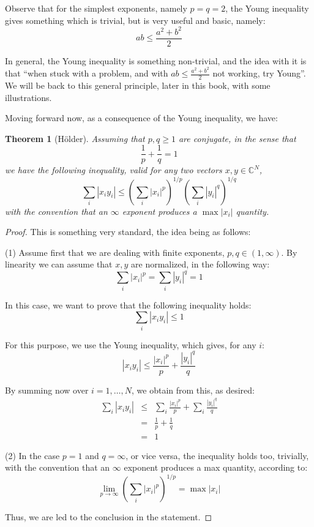 \documentclass[12pt]{amsbook}
\newtheorem{theorem}{Theorem}[chapter]
\begin{document}
Observe that for the simplest exponents, namely $p=q=2$, the Young inequality gives something which is trivial, but is very useful and basic, namely:
$$ab\leq\frac{a^2+b^2}{2}$$

In general, the Young inequality is something non-trivial, and the idea with it is that ``when stuck with a problem, and with $ab\leq\frac{a^2+b^2}{2}$ not working, try Young''. We will be back to this general principle, later in this book, with some illustrations.

\bigskip

Moving forward now, as a consequence of the Young inequality, we have:


\begin{theorem}[H\"older]
Assuming that $p,q\geq 1$ are conjugate, in the sense that 
$$\frac{1}{p}+\frac{1}{q}=1$$
we have the following inequality, valid for any two vectors $x,y\in\mathbb C^N$,
$$\sum_i|x_iy_i|\leq\left(\sum_i|x_i|^p\right)^{1/p}\left(\sum_i|y_i|^q\right)^{1/q}$$
with the convention that an $\infty$ exponent produces a $\max|x_i|$ quantity.
\end{theorem}

\begin{proof}
This is something very standard, the idea being as follows:

\medskip

(1) Assume first that we are dealing with finite exponents, $p,q\in(1,\infty)$. By linearity we can assume that $x,y$ are normalized, in the following way:
$$\sum_i|x_i|^p=\sum_i|y_i|^q=1$$

In this case, we want to prove that the following inequality holds:
$$\sum_i|x_iy_i|\leq1$$

For this purpose, we use the Young inequality, which gives, for any $i$:
$$|x_iy_i|\leq\frac{|x_i|^p}{p}+\frac{|y_i|^q}{q}$$

By summing now over $i=1,\ldots,N$, we obtain from this, as desired:
\begin{eqnarray*}
\sum_i|x_iy_i|
&\leq&\sum_i\frac{|x_i|^p}{p}+\sum_i\frac{|y_i|^q}{q}\\
&=&\frac{1}{p}+\frac{1}{q}\\
&=&1
\end{eqnarray*}

(2) In the case $p=1$ and $q=\infty$, or vice versa, the inequality holds too, trivially, with the convention that an $\infty$ exponent produces a max quantity, according to:
$$\lim_{p\to\infty}\left(\sum_i|x_i|^p\right)^{1/p}=\max|x_i|$$

Thus, we are led to the conclusion in the statement.
\end{proof}
\end{document}
